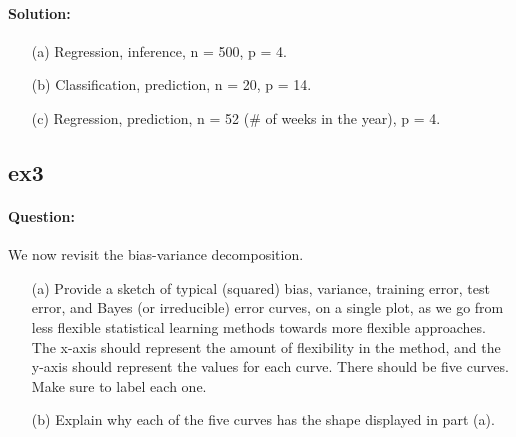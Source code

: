 \documentclass[a4paper,12pt,titlepage]{article} %
\begin{document}
\paragraph{Solution:}
\begin{itemize}
	\item[(a)] Regression, inference, n = 500, p = 4.
	\item[(b)] Classification, prediction, n = 20, p = 14.
	\item[(c)] Regression, prediction, n = 52 (\# of weeks in the year), p = 4.
\end{itemize}


\subsection{ex3}
\paragraph{Question:} We now revisit the bias-variance decomposition.

\begin{itemize}
	\item[(a)] Provide a sketch of typical (squared) bias, variance, training error, test error, and Bayes (or irreducible) error curves, on a single plot, as we go from less flexible statistical learning methods towards more flexible approaches. The x-axis should represent the amount of flexibility in the method, and the y-axis should represent the values for each curve. There should be five curves.	Make sure to label each one.
	
	\item[(b)] Explain why each of the five curves has the shape displayed in part (a).	
\end{itemize}
\end{document}
